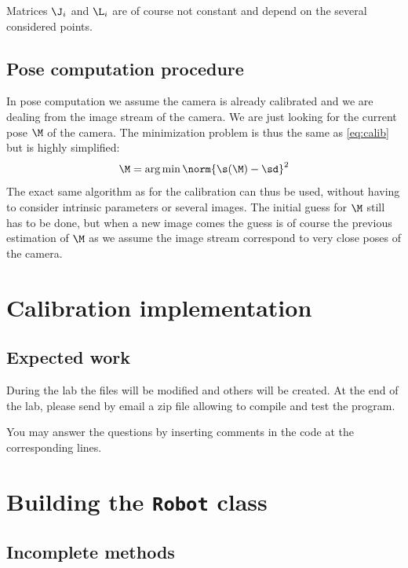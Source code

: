 \documentclass{ecnreport}
\begin{document}
Matrices $\J_i$ and $\L_i$ are of course not constant and depend on the several considered points. 

\subsection{Pose computation procedure}

In pose computation we assume the camera is already calibrated and we are dealing from the image stream of the camera.
We are just looking for the current pose $\M$ of the camera.
The minimization problem is thus the same as \eqref{eq:calib} but is highly simplified:
\begin{equation}\label{eq:pose comp}
\M = \arg\min \norm{\s(\M) - \sd}^2
\end{equation}The exact same algorithm as for the calibration can thus be used, without having to consider intrinsic parameters or several images.
The initial guess for $\M$ still has to be done, but when a new image comes the guess is of course the previous estimation of $\M$ as we assume the image stream 
correspond to very close poses of the camera.






\section{Calibration implementation}


\subsection{Expected work}

During the lab the files will be modified and others will be created.
At the end of the lab, please send by email a zip file allowing to compile and test the program.

You may answer the questions by inserting comments in the code at the corresponding lines.



\newpage

\section{Building the \texttt{Robot} class}

\subsection{Incomplete methods}
\end{document}
